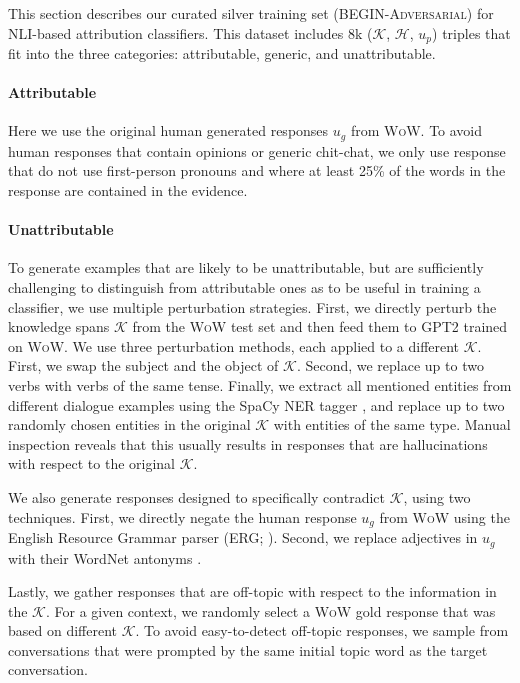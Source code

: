 This section describes our curated silver training set (\textsc{BEGIN-Adversarial}) for NLI-based attribution classifiers. This dataset includes 8k ($\mathcal{K}$, $\mathcal{H}$, $u_p$) triples that fit into the three categories: attributable, generic, and unattributable.

\paragraph{Attributable} Here we use the original human generated responses $u_g$ from \textsc{WoW}. To avoid human responses that contain opinions or generic chit-chat, we only use response that do not use first-person pronouns 
and where at least 25\% of the words in the response are contained in the evidence.

\paragraph{Unattributable}
To generate examples that are likely to be unattributable, but  are sufficiently challenging to distinguish from attributable ones as to be useful in training a classifier, we use multiple perturbation strategies.  First, we directly perturb the knowledge spans $\mathcal{K}$ from the \textsc{WoW} test set and then feed them to \textsc{GPT2} trained on \textsc{WoW}. We use three perturbation methods, each applied to a different  $\mathcal{K}$. First, we 
swap the subject and the object of  $\mathcal{K}$. Second, we replace up to two verbs with verbs of the same tense. Finally, we 
extract all mentioned entities from different dialogue examples using the SpaCy NER tagger \cite{honnibal2017spacy}, and replace up to two randomly chosen entities in the original $\mathcal{K}$ with entities of the same type. Manual inspection reveals that this usually results in responses that are hallucinations with respect to the original $\mathcal{K}$.

We also generate responses designed to specifically contradict $\mathcal{K}$, using two techniques. First, we directly negate the human response $u_g$ from \textsc{WoW} using the English Resource Grammar parser (ERG; \citealt{Fli:Ben:Oep:14}). 
Second, we replace adjectives in $u_g$ with their WordNet antonyms \cite{miller1998wordnet}. 

Lastly, we gather responses that are off-topic with respect to the information in the $\mathcal{K}$. For a given context, we randomly select a \textsc{WoW} gold response that was based on different  $\mathcal{K}$. To avoid easy-to-detect off-topic responses, we sample from conversations that were prompted by the same initial topic word as the target conversation.

